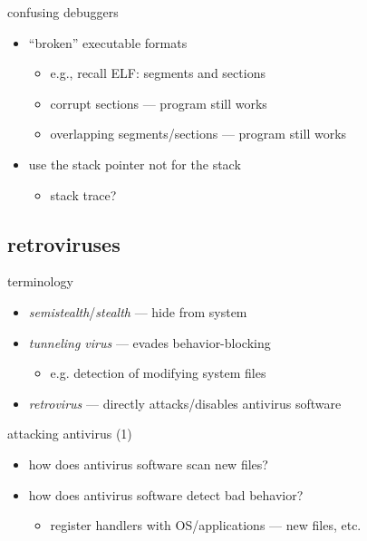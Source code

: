 \begin{frame}{confusing debuggers}
    \begin{itemize}
    \item ``broken'' executable formats
        \begin{itemize}
        \item e.g., recall ELF: segments and sections
        \item corrupt sections --- program still works
        \item overlapping segments/sections --- program still works
        \end{itemize}
    \item use the stack pointer not for the stack
        \begin{itemize}
        \item stack trace?
        \end{itemize}
    \end{itemize}
\end{frame}

\subsection{retroviruses}


\begin{frame}{terminology}
    \begin{itemize}
    \item \textit{semistealth}/\textit{stealth} --- hide from system
    \item \textit{tunneling virus} --- evades behavior-blocking
        \begin{itemize}
        \item e.g. detection of modifying system files
        \end{itemize}
    \item \textit{retrovirus} --- directly attacks/disables antivirus software
    \end{itemize}
\end{frame}

\begin{frame}{attacking antivirus (1)}
    \begin{itemize}
    \item how does antivirus software scan new files?
    \item how does antivirus software detect bad behavior?
        \begin{itemize}
        \item register handlers with OS/applications --- new files, etc.
        \end{itemize}
    \end{itemize}
\end{frame}

